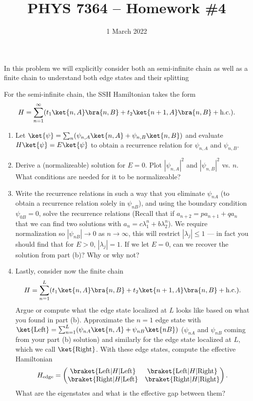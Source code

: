\documentclass{jhwhw}
\author{}
\title{PHYS 7364 -- Homework \#4}
\date{1 March 2022}
\begin{document}

In this problem we will explicitly consider both an semi-infinite chain as well as a finite chain to understand both edge states and their splitting

For the semi-infinite chain, the SSH Hamiltonian takes the form
\begin{equation}
  \label{eq:4}
  H = \sum_{n=1}^{\infty} (t_{1} \ket{n,A}\bra{n,B} + t_{2}\ket{n+1,A}\bra{n,B} + \mathrm{h.c.}).
\end{equation}
\begin{enumerate}
  \item Let $\ket{\psi} = \sum_{n}( \psi_{n,A} \ket{n,A} + \psi_{n,B}\ket{n,B})$ and evaluate $H \ket{\psi} = E \ket{\psi}$ to obtain a recurrence relation for $\psi_{n,A}$ and $\psi_{n,B}$.
  \item Derive a (normalizeable) solution for $E=0$. Plot $|\psi_{n,A}|^{2}$ and $|\psi_{n,B}|^{2}$ vs. $n$. What conditions are needed for it to be normalizeable?
\item Write the recurrence relations in such a way that you eliminate $\psi_{nA}$ (to obtain a recurrence relation solely in $\psi_{nB}$), and using the boundary condition $\psi_{0B} = 0$, solve the recurrence relations (Recall that if $a_{n+2} = p a_{n+1} + q a_{n}$ that we can find two solutions with $a_{n} =c \lambda_{1}^{n} + b \lambda_{2}^{n}$). We require normalization so $|\psi_{nB}|\rightarrow 0 $ as $n\rightarrow\infty$, this will restrict $|\lambda_{j}|\leq 1$ --- in fact you should find that for $E>0$, $|\lambda_{j}|=1$. If we let $E=0$, can we recover the solution from part (b)? Why or why not?
  \item Lastly, consider now the finite chain
        \begin{equation}
          \label{eq:5}
  H = \sum_{n=1}^{L} (t_{1} \ket{n,A}\bra{n,B} + t_{2}\ket{n+1,A}\bra{n,B} + \mathrm{h.c.}).
        \end{equation}
        Argue or compute what the edge state localized at $L$ looks like based on what you found in part (b). Approximate the $n=1$ edge state with $\ket{\mathrm{Left}} = \sum_{n=1}^{L}( \psi_{nA} \ket{n, A} + \psi_{nB} \ket{nB})$ ($\psi_{nA}$ and $\psi_{nB}$ coming from your part (b) solution) and similarly for the edge state localized at $L$, which we call $\ket{\mathrm{Right}}$. With these edge states, compute the effective Hamiltonian
        \begin{equation}
          \label{eq:6}
          H_{\mathrm{edge}} =
          \begin{pmatrix}
            \braket{\mathrm{Left}|H|\mathrm{Left}} &
            \braket{\mathrm{Left}|H|\mathrm{Right}} \\
            \braket{\mathrm{Right}|H|\mathrm{Left}} &
            \braket{\mathrm{Right}|H|\mathrm{Right}}
          \end{pmatrix}.
        \end{equation}
        What are the eigenstates and what is the effective gap between them?
\end{enumerate}
\end{document}
